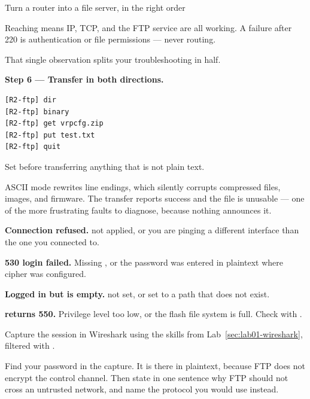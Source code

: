 \begin{labproject}{Turn a router into a file server, in the right order}
\begin{keyidea}
Reaching  means IP, TCP, and the FTP service are all working. A failure after 220 is authentication or file permissions --- never routing.

That single observation splits your troubleshooting in half.
\end{keyidea}

\medskip\noindent\textbf{Step 6 --- Transfer in both directions.}\par

\begin{lstlisting}[style=utpterminal]
[R2-ftp] dir
[R2-ftp] binary
[R2-ftp] get vrpcfg.zip
[R2-ftp] put test.txt
[R2-ftp] quit
\end{lstlisting}

\begin{pitfall}
Set  before transferring anything that is not plain text.

ASCII mode rewrites line endings, which silently corrupts compressed files, images, and firmware. The transfer reports success and the file is unusable --- one of the more frustrating faults to diagnose, because nothing announces it.
\end{pitfall}

\begin{troubleshoot}
\textbf{Connection refused.}  not applied, or you are pinging a different interface than the one you connected to.

\textbf{530 login failed.} Missing , or the password was entered in plaintext where cipher was configured.

\textbf{Logged in but  is empty.}  not set, or set to a path that does not exist.

\textbf{ returns 550.} Privilege level too low, or the flash file system is full. Check with .
\end{troubleshoot}

\begin{tryit}
Capture the session in Wireshark using the skills from Lab~\ref{sec:lab01-wireshark}, filtered with .

Find your password in the capture. It is there in plaintext, because FTP does not encrypt the control channel. Then state in one sentence why FTP should not cross an untrusted network, and name the protocol you would use instead.
\end{tryit}
\end{labproject}

